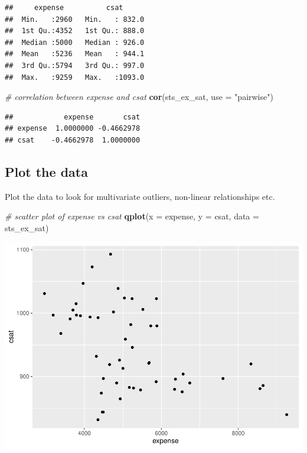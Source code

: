 \documentclass[
]{book}
\newenvironment{Shaded}{\begin{snugshade}}{\end{snugshade}}
\newcommand{\CommentTok}[1]{\textcolor[rgb]{0.56,0.35,0.01}{\textit{#1}}}
\newcommand{\DataTypeTok}[1]{\textcolor[rgb]{0.13,0.29,0.53}{#1}}
\newcommand{\KeywordTok}[1]{\textcolor[rgb]{0.13,0.29,0.53}{\textbf{#1}}}
\newcommand{\NormalTok}[1]{#1}
\newcommand{\StringTok}[1]{\textcolor[rgb]{0.31,0.60,0.02}{#1}}
\begin{document}
\begin{verbatim}
##     expense          csat       
##  Min.   :2960   Min.   : 832.0  
##  1st Qu.:4352   1st Qu.: 888.0  
##  Median :5000   Median : 926.0  
##  Mean   :5236   Mean   : 944.1  
##  3rd Qu.:5794   3rd Qu.: 997.0  
##  Max.   :9259   Max.   :1093.0
\end{verbatim}

\begin{Shaded}
\begin{Highlighting}[]
  \CommentTok{\# correlation between expense and csat}
  \KeywordTok{cor}\NormalTok{(sts\_ex\_sat, }\DataTypeTok{use =} \StringTok{"pairwise"}\NormalTok{) }
\end{Highlighting}
\end{Shaded}

\begin{verbatim}
##            expense       csat
## expense  1.0000000 -0.4662978
## csat    -0.4662978  1.0000000
\end{verbatim}

\hypertarget{plot-the-data}{%
\subsection{Plot the data}\label{plot-the-data}}

Plot the data to look for multivariate outliers, non-linear relationships etc.

\begin{Shaded}
\begin{Highlighting}[]
  \CommentTok{\# scatter plot of expense vs csat}
  \KeywordTok{qplot}\NormalTok{(}\DataTypeTok{x =}\NormalTok{ expense, }\DataTypeTok{y =}\NormalTok{ csat, }\DataTypeTok{data =}\NormalTok{ sts\_ex\_sat)}
\end{Highlighting}
\end{Shaded}

\includegraphics{R/Rmodels/figures/unnamed-chunk-83-1.pdf}
\end{document}
